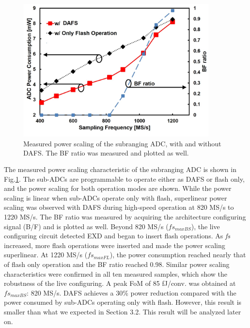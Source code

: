
\begin{figure}
\centering
  \includegraphics[width=0.9\textwidth]{figure/chap3/fig17.jpg}
  \caption{Measured power scaling of the subranging ADC, with and without
DAFS. The BF ratio was measured and plotted as well.}
  \label{fig-3-17}
\end{figure}

The measured power scaling characteristic of the subranging ADC is shown in Fig.\ref{fig-3-17}. The sub-ADCs are programmable to operate either as DAFS or flash only, and the power scaling for both operation modes are shown. While the power scaling is linear when sub-ADCs operate only with flash, superlinear power scaling was observed with DAFS during high-speed operation at 820 MS/s to 1220 MS/s. The BF ratio was measured by acquiring the architecture configuring signal (B/F) and is plotted as well. Beyond 820 MS/s ($fs_{maxBS}$), the live configuring circuit detected EXD and began to insert flash operations. As \textit{fs} increased, more flash operations were inserted and made the power scaling superlinear. At 1220 MS/s ($fs_{maxFL}$), the power consumption reached nearly that of flash only operation and the BF ratio reached 0.98. Similar power scaling characteristics were confirmed in all ten measured samples, which show the robustness of the live configuring. A peak FoM of 85 fJ/conv. was obtained at $fs_{maxBS}$: 820 MS/s. DAFS achieves a 30\% power reduction compared with the power consumed by sub-ADCs operating only with flash. However, this result is smaller than what we expected in Section 3.2. This result will be analyzed later on.

